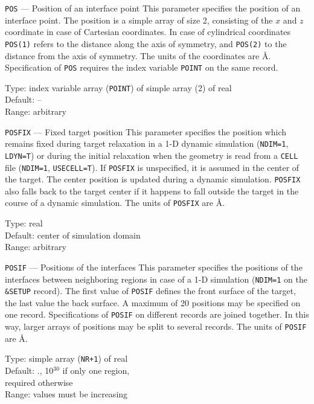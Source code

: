 \begin{keydescription}{\texttt{POS} --- Position of an interface point}
%
  This parameter specifies the position of an interface point. The
  position is a simple array of size 2, consisting of the $x$ and $z$
  coordinate in case of Cartesian coordinates. In case of cylindrical
  coordinates \texttt{POS(1)} refers to the distance along the axis of
  symmetry, and \texttt{POS(2)} to the distance from the axis of symmetry.
  The units of the coordinates are \AA.  Specification of \texttt{POS} 
  requires the index variable \texttt{POINT} on the same record. 
  \begin{keytab}
    Type:    \> index variable array (\texttt{POINT}) of simple array
                (2) of real \\
    Default: \> -- \\
   Range:    \> arbitrary
\end{keytab}
\end{keydescription}

\begin{keydescription}{\texttt{POSFIX} --- Fixed target position}
%
  This parameter specifies the position which remains fixed during
  target relaxation in a 1-D dynamic simulation (\texttt{NDIM=1},
  \texttt{LDYN=T}) or during the initial relaxation when the geometry is read 
  from a \texttt{CELL} file (\texttt{NDIM=1}, \texttt{USECELL=T}).  If 
  \texttt{POSFIX} is unspecified, it is assumed in the center of the target.
  The center position is updated during a dynamic simulation. \texttt{POSFIX}
  also falls back to the target center if it happens to fall outside the target
  in the course of a dynamic simulation.  The units of \texttt{POSFIX} are \AA.
  \begin{keytab}
    Type:    \> real \\
   Default:  \> center of simulation domain \\
   Range:    \> arbitrary
\end{keytab}
\end{keydescription}

\begin{keydescription}{\texttt{POSIF} --- Positions of the interfaces}
%
  This parameter specifies the positions of the interfaces between
  neighboring regions in case of a 1-D simulation (\texttt{NDIM=1} on
  the \texttt{\&SETUP} record). The first value of \texttt{POSIF}
  defines the front surface of the target, the last value the back
  surface.  A maximum of 20 positions may be specified on one record.
  Specifications of \texttt{POSIF} on different records are joined together.  In
  this way, larger arrays of positions may be split to several records.  The
  units of \texttt{POSIF} are \AA. 
  \begin{keytab}
    Type:    \> simple array (\texttt{NR+1}) of real \\
    Default: ., 10$^{30}$ if only one region, \\
             \> required otherwise \\
    Range:   \> values must be increasing
  \end{keytab}
\end{keydescription}

